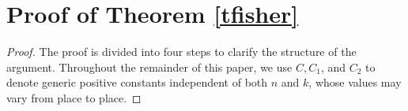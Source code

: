 \documentclass[ejsv2]{imsart}
\theoremstyle{plain}
\theoremstyle{definition}
\theoremstyle{remark}
\begin{document}

\section{Proof of Theorem \ref{tfisher}}\label{sec:5}
\begin{proof}%
The proof is divided into four steps to clarify the structure of
the argument. 
Throughout the remainder of this paper, we use
$C, C_1$, and $C_2$ to denote generic positive
constants independent of both $n$ and $k$, whose values may vary from place to place.





\end{proof}
\end{document}
